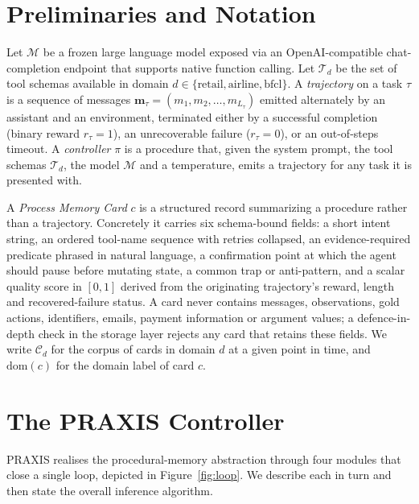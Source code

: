 \documentclass[conference]{IEEEtran}
\begin{document}
\section{Preliminaries and Notation}

Let $\mathcal{M}$ be a frozen large language model exposed via an
OpenAI-compatible chat-completion endpoint that supports native
function calling. Let $\mathcal{T}_d$ be the set of tool schemas
available in domain $d \in \{\text{retail}, \text{airline},
\text{bfcl}\}$. A \emph{trajectory} on a task $\tau$ is a sequence
of messages $\mathbf{m}_\tau = (m_1, m_2, \ldots, m_{L_\tau})$
emitted alternately by an assistant and an environment, terminated
either by a successful completion (binary reward $r_\tau = 1$), an
unrecoverable failure ($r_\tau = 0$), or an out-of-steps timeout.
A \emph{controller} $\pi$ is a procedure that, given the system
prompt, the tool schemas $\mathcal{T}_d$, the model $\mathcal{M}$
and a temperature, emits a trajectory for any task it is presented
with.

A \emph{Process Memory Card} $c$ is a structured record summarizing
a procedure rather than a trajectory. Concretely it carries six
schema-bound fields: a short intent string, an ordered tool-name
sequence with retries collapsed, an evidence-required predicate
phrased in natural language, a confirmation point at which the
agent should pause before mutating state, a common trap or
anti-pattern, and a scalar quality score in $[0, 1]$ derived from
the originating trajectory's reward, length and recovered-failure
status. A card never contains messages, observations, gold
actions, identifiers, emails, payment information or argument
values; a defence-in-depth check in the storage layer rejects any
card that retains these fields. We write $\mathcal{C}_d$ for the
corpus of cards in domain $d$ at a given point in time, and
$\mathrm{dom}(c)$ for the domain label of card $c$.

\section{The PRAXIS Controller}\label{sec:method}

PRAXIS realises the procedural-memory abstraction through four
modules that close a single loop, depicted in
Figure~\ref{fig:loop}. We describe each in turn and then state the
overall inference algorithm.
\end{document}
